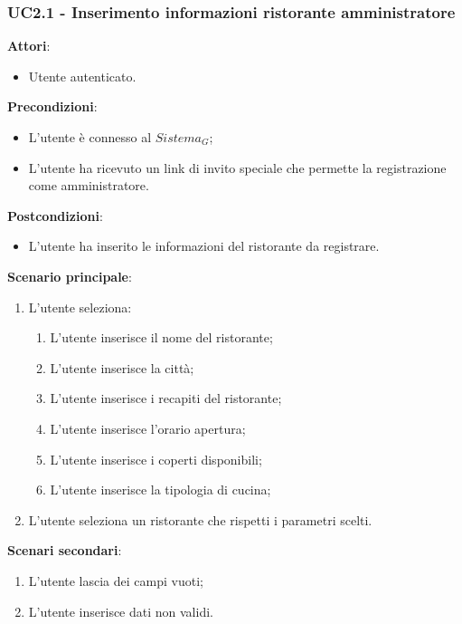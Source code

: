 \subsubsection{UC2.1 - Inserimento informazioni ristorante amministratore}\label{usecase:2_1}
\textbf{Attori}:
\begin{itemize}
    \item Utente autenticato.
\end{itemize}
\textbf{Precondizioni}:
\begin{itemize}
    \item L'utente è connesso al $\textit{Sistema}_G$;
    \item L'utente ha ricevuto un link di invito speciale che permette la registrazione come amministratore.
\end{itemize}
\textbf{Postcondizioni}:
\begin{itemize}
    \item L'utente ha inserito le informazioni del ristorante da registrare.
\end{itemize}
\textbf{Scenario principale}:
\begin{enumerate}
    \item L'utente seleziona:
    \begin{enumerate}
        \item L'utente inserisce il nome del ristorante;
        \item L'utente inserisce la città;
        \item L'utente inserisce i recapiti del ristorante;
        \item L'utente inserisce l'orario apertura;
        \item L'utente inserisce i coperti disponibili;
        \item L'utente inserisce la tipologia di cucina;
    \end{enumerate}
    \item L'utente seleziona un ristorante che rispetti i parametri scelti.
\end{enumerate}
\textbf{Scenari secondari}:
    \begin{enumerate}
        \item L'utente lascia dei campi vuoti;
        \item L'utente inserisce dati non validi.
    \end{enumerate}
\newpage